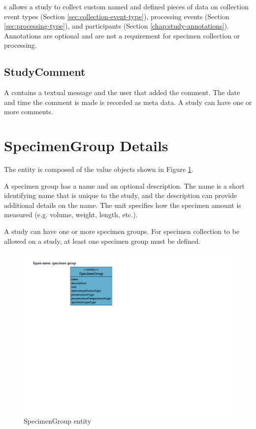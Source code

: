 s allows a study to collect custom named and
defined pieces of data on collection event types (Section
\ref{sec:collection-event-type}), processing events (Section
\ref{sec:processing-type}), and participants (Section
\ref{chap:study-annotations}). Annotations are optional and are not a
requirement for specimen collection or processing.

\subsection*{StudyComment}
A  contains a textual message and the user that
added the comment. The date and time the comment is made is recorded as meta
data. A study can have one or more comments.

\section{SpecimenGroup Details}
\label{sec:specimen-group}

The  entity is composed of the value objects shown
in Figure \ref{fig:specimen-group}.

A specimen group has a name and an optional description. The name is a short
identifying name that is unique to the study, and the description can provide
additional details on the name. The unit specifies how the specimen amount is
measured (e.g. volume, weight, length, etc.).

A study can have one or more specimen groups. For specimen collection to be
allowed on a study, at least one specimen group must be defined.

\begin{figure}[H]
  \centering
  \includegraphics[trim={9mm 140mm 80mm 18mm}, clip,
    width=1\textwidth]{images/specimen-group}
  \caption{SpecimenGroup entity}
  \label{fig:specimen-group}
\end{figure}

